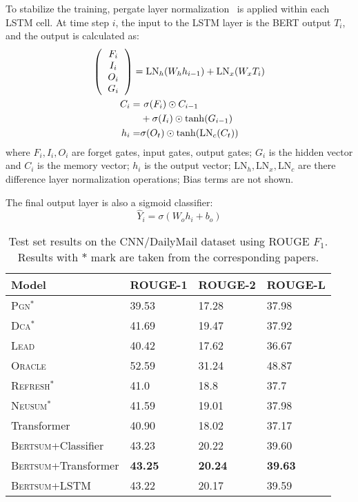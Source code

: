 \documentclass[11pt,a4paper]{article}
\begin{document}
    To stabilize the training,  pergate layer normalization~\cite{ba2016layer} is applied within each LSTM cell. At time step $i$, the input to the LSTM layer is the BERT output $T_i$, and the output is calculated as:
    \begin{gather}
    \left (
    \begin{tabular}{c}
    $F_i$ \\
    $I_i$\\
    $O_i$\\
    $G_i$
    \end{tabular}
    \right )=\mathrm{LN}_h(W_hh_{i-1})+\mathrm{LN}_x(W_xT_i)\\
    \begin{align}
    \nonumber C_i =&~\sigma(F_i)\odot C_{i-1}\\
    &+\sigma(I_i)\odot \mathrm{tanh}(G_{i-1})\\
    h_i = &\sigma(O_t)\odot \mathrm{tanh}(\mathrm{LN}_c(C_t))\end{align}
    \end{gather}
    where  $F_i, I_i, O_i$ are forget gates, input gates, output gates; $G_i$ is the hidden vector and $C_i$ is the memory vector; $h_i$ is the  output vector; $\mathrm{LN}_h, \mathrm{LN}_x, \mathrm{LN}_c$ are there difference layer normalization operations; Bias terms are not shown.
    
    The final output layer is also a sigmoid classifier:
    \begin{equation}
   \hat{Y}_i = \sigma(W_oh_i+b_o)
    \end{equation}
    
                \begin{table*}[htbp]
    \center
    \begin{tabular}{l|lll}
        Model              & ROUGE-1    & ROUGE-2    & ROUGE-L    \\ \hline
        \textsc{Pgn}$^*$  &39.53&17.28&37.98\\

        \textsc{Dca}$^*$  &41.69&19.47&37.92\\\hline
        \textsc{Lead}               & 40.42  & 17.62  & 36.67  \\
                \textsc{Oracle}               & 52.59  & 31.24 & 48.87  \\
        \textsc{Refresh}$^*$              & 41.0  & 18.8 & 37.7  \\
        \textsc{Neusum}$^*$              & 41.59  & 19.01  & 37.98  \\\hline

        Transformer& 40.90 & 18.02  & 37.17  \\
        \textsc{Bertsum}+Classifier  & 43.23  & 20.22 & 39.60\\
        \textsc{Bertsum}+Transformer  & \textbf{43.25}& \textbf{20.24}& \textbf{39.63}\\
        \textsc{Bertsum}+LSTM  & 43.22  & 20.17 & 39.59
    \end{tabular}
    \caption{Test set results on  the CNN/DailyMail  dataset using  ROUGE $F_1$. Results with $*$ mark
        are taken from the corresponding papers.}
\end{table*}
\end{document}
